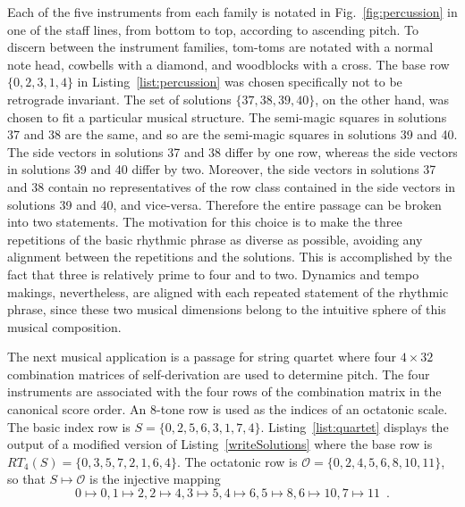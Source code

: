 
Each of the five instruments from each family is notated in Fig.~\ref{fig:percussion} in one of the staff lines, from bottom to top, according to ascending pitch. To discern between the instrument families, tom-toms are notated with a normal note head, cowbells with a diamond, and woodblocks with a cross. The base row $\{0, 2, 3, 1, 4\}$ in Listing~\ref{list:percussion} was chosen specifically not to be retrograde invariant. The set of solutions $\{37, 38, 39, 40\}$, on the other hand, was chosen to fit a particular musical structure. The semi-magic squares in solutions 37 and 38 are the same, and so are the semi-magic squares in solutions 39 and 40. The side vectors in solutions 37 and 38 differ by one row, whereas the side vectors in solutions 39 and 40 differ by two. Moreover, the side vectors in solutions 37 and 38 contain no representatives of the row class contained in the side vectors in solutions 39 and 40, and vice-versa. Therefore the entire passage can be broken into two statements. The motivation for this choice is to make the three repetitions of the basic rhythmic phrase as diverse as possible, avoiding any alignment between the repetitions and the solutions. This is accomplished by the fact that three is relatively prime to four and to two. Dynamics and tempo makings, nevertheless, are aligned with each repeated statement of the rhythmic phrase, since these two musical dimensions belong to the intuitive sphere of this musical composition.

The next musical application is a passage for string quartet where four $4 \times 32$ combination matrices of self-derivation are used to determine pitch. The four instruments are associated with the four rows of the combination matrix in the canonical score order. An 8-tone row is used as the indices of an octatonic scale. The basic index row is $S = \{0, 2, 5, 6, 3, 1, 7, 4\}$. Listing~\ref{list:quartet} displays the output of a modified version of Listing~\ref{writeSolutions} where the base row is $RT_4(S) = \{0, 3, 5, 7, 2, 1, 6, 4\}$. The octatonic row is $\mathcal{O} = \{0, 2, 4, 5, 6, 8, 10, 11\}$, so that $S \mapsto \mathcal{O}$ is the injective mapping
\begin{equation}
	0 \mapsto 0, 1 \mapsto 2, 2 \mapsto 4, 3 \mapsto 5, 4 \mapsto 6, 5 \mapsto 8, 6 \mapsto 10, 7 \mapsto 11 \enspace . 
\end{equation}

